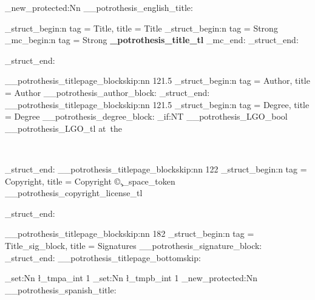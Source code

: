 \cs_new_protected:Nn \__potrothesis_english_title:
	{
		{ \centering
			\setlength{\parskip}{7.5pt plus 1pt minus 1pt} %
			\setlength{\parindent}{0pt}
			{
				\tag_struct_begin:n { tag = Title, title = Title }
				\leavevmode
				\tag_struct_begin:n { tag = Strong } %
				\tag_mc_begin:n { tag = Strong }
				\Large\textbf{ \g_potrothesis_title_tl }
				\tag_mc_end:
				\tag_struct_end:
				\par
				\tag_struct_end:
			}
			\__potrothesis_titlepage_blockskip:nn {12}{1.5}
			\tag_struct_begin:n { tag = Author, title = Author }
			\__potrothesis_author_block:
			\tag_struct_end:
			\__potrothesis_titlepage_blockskip:nn {12}{1.5}
			\tag_struct_begin:n { tag = Degree, title = Degree } 
			\__potrothesis_degree_block:
			\bool_if:NT \g__potrothesis_LGO_bool { \g__potrothesis_LGO_tl }
			at~the\par
			 \par
			\DegreeMonth\ \DegreeYear\par
			\tag_struct_end:
			\__potrothesis_titlepage_blockskip:nn {12}{2}
			\tag_struct_begin:n { tag = Copyright, title = Copyright }
			\copyright\space\DegreeYear\space\CopyrightAuthor\@.\c_space_token \g__potrothesis_copyright_license_tl %
			\par %
			\tag_struct_end:
		}
		\__potrothesis_titlepage_blockskip:nn {18}{2}
		\tag_struct_begin:n { tag = Title_sig_block, title = Signatures }
		\__potrothesis_signature_block:
		\tag_struct_end:
		\__potrothesis_titlepage_bottomskip:
	}
\int_set:Nn  \l_tmpa_int {1} %
\int_set:Nn  \l_tmpb_int {1} %
\cs_new_protected:Nn \__potrothesis_spanish_title:

